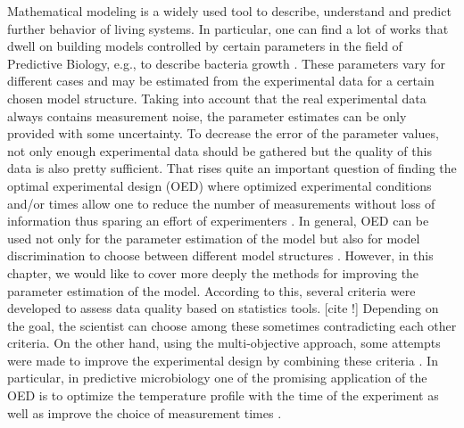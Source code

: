 \documentclass[10pt,A4paper]{article}
\begin{document}
Mathematical modeling is a widely used tool to describe, understand and predict further behavior of living systems.
In particular, one can find a lot of works that dwell on building models controlled by certain parameters in the field of Predictive Biology, e.g., to describe bacteria growth \cite{perez-rodriguezPredictiveMicrobiologyFoods2012, bernaertsConceptsToolsPredictive2004}.
These parameters vary for different cases and may be estimated from the experimental data for a certain chosen model structure.
Taking into account that the real experimental data always contains measurement noise, the parameter estimates can be only provided with some uncertainty. 
To decrease the error of the parameter values, not only enough experimental data should be gathered but the quality of this data is also pretty sufficient.
That rises quite an important question of finding the optimal experimental design (OED) where optimized experimental conditions and/or times allow one to reduce the number of measurements without loss of information thus sparing an effort of experimenters \cite{derlindenImpactExperimentDesign2013, balsa-cantoe.bangaj.r.COMPUTINGOPTIMALDYNAMIC2008}. 
In general, OED can be used not only for the parameter estimation of the model but also for model discrimination to choose between different model structures \cite{kreutzSystemsBiology2009, stamatiOptimalExperimentalDesign2016}.
However, in this chapter, we would like to cover more deeply the methods for improving the parameter estimation of the model.
According to this, several criteria were developed to assess data quality based on statistics tools. [cite !]
Depending on the goal, the scientist can choose among these sometimes contradicting each other criteria.
On the other hand, using the multi-objective approach, some attempts were made to improve the experimental design by combining these criteria \cite{telenOptimalExperimentDesign2012, logistRobustMultiobjectiveOptimal2011}.
In particular, in predictive microbiology one of the promising application of the OED is to optimize the temperature profile with the time of the experiment as well as improve the choice of measurement times \cite{balsa-cantoe.bangaj.r.COMPUTINGOPTIMALDYNAMIC2008, garciaQualityShelflifePrediction2015, versyckIntroducingOptimal1999}.
\end{document}
